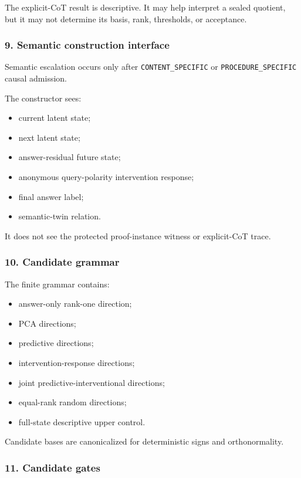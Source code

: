 \documentclass[
  10pt,
]{article}
\providecommand{\tightlist}{%
  \setlength{\itemsep}{0pt}\setlength{\parskip}{0pt}}
\begin{document}
The explicit-CoT result is descriptive. It may help interpret a sealed
quotient, but it may not determine its basis, rank, thresholds, or
acceptance.

\subsubsection{9. Semantic construction
interface}\label{semantic-construction-interface}

Semantic escalation occurs only after \texttt{CONTENT\_SPECIFIC} or
\texttt{PROCEDURE\_SPECIFIC} causal admission.

The constructor sees:

\begin{itemize}
\tightlist
\item
  current latent state;
\item
  next latent state;
\item
  answer-residual future state;
\item
  anonymous query-polarity intervention response;
\item
  final answer label;
\item
  semantic-twin relation.
\end{itemize}

It does not see the protected proof-instance witness or explicit-CoT
trace.

\subsubsection{10. Candidate grammar}\label{candidate-grammar}

The finite grammar contains:

\begin{itemize}
\tightlist
\item
  answer-only rank-one direction;
\item
  PCA directions;
\item
  predictive directions;
\item
  intervention-response directions;
\item
  joint predictive-interventional directions;
\item
  equal-rank random directions;
\item
  full-state descriptive upper control.
\end{itemize}

Candidate bases are canonicalized for deterministic signs and
orthonormality.

\subsubsection{11. Candidate gates}\label{candidate-gates}
\end{document}
